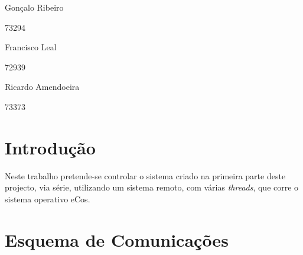 \documentclass[a4paper]{article}
\begin{document}

    
    
	





	\trSetAuthors
	{
		\begin{center}
			Gonçalo Ribeiro

			73294
		\end{center}
	}{
		\begin{center}
			Francisco Leal

			72939
		\end{center}
	}{
		\begin{center}
			Ricardo Amendoeira

			73373
		\end{center}
	}


\trMakeCover
    
	\restoregeometry

	\tableofcontents

	\pagebreak

	\setcounter{page}{1}



	\section{Introdução}
    
    Neste trabalho pretende-se controlar o sistema criado na primeira parte deste projecto, via série, utilizando um sistema remoto, com várias \textit{threads}, que corre o sistema operativo eCos.
    

	\section{Esquema de Comunicações}
\end{document}
